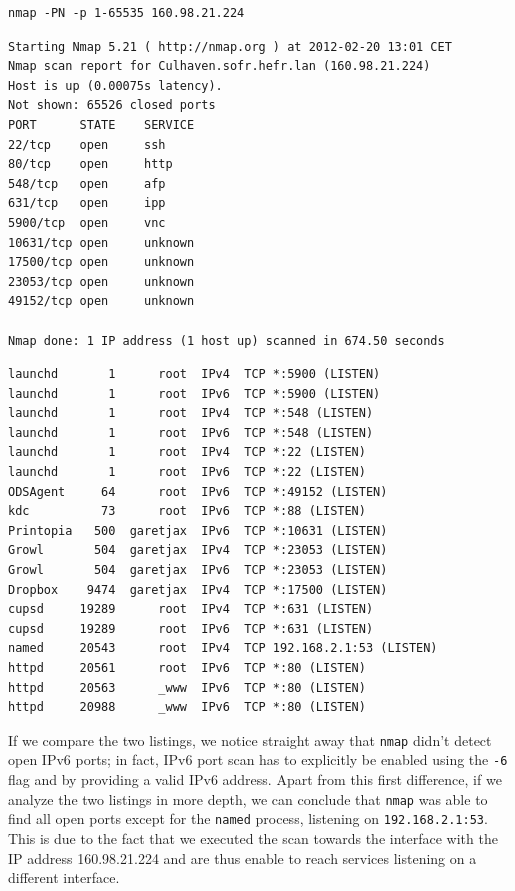\documentclass[10pt,a4paper,twoside,onecolumn]{article}
\begin{document}
\begin{lstlisting}
nmap -PN -p 1-65535 160.98.21.224
\end{lstlisting}

\begin{lstlisting}
Starting Nmap 5.21 ( http://nmap.org ) at 2012-02-20 13:01 CET
Nmap scan report for Culhaven.sofr.hefr.lan (160.98.21.224)
Host is up (0.00075s latency).
Not shown: 65526 closed ports
PORT      STATE    SERVICE
22/tcp    open     ssh
80/tcp    open     http
548/tcp   open     afp
631/tcp   open     ipp
5900/tcp  open     vnc
10631/tcp open     unknown
17500/tcp open     unknown
23053/tcp open     unknown
49152/tcp open     unknown

Nmap done: 1 IP address (1 host up) scanned in 674.50 seconds
\end{lstlisting}

\begin{lstlisting}
launchd       1      root  IPv4  TCP *:5900 (LISTEN)
launchd       1      root  IPv6  TCP *:5900 (LISTEN)
launchd       1      root  IPv4  TCP *:548 (LISTEN)
launchd       1      root  IPv6  TCP *:548 (LISTEN)
launchd       1      root  IPv4  TCP *:22 (LISTEN)
launchd       1      root  IPv6  TCP *:22 (LISTEN)
ODSAgent     64      root  IPv6  TCP *:49152 (LISTEN)
kdc          73      root  IPv6  TCP *:88 (LISTEN)
Printopia   500  garetjax  IPv6  TCP *:10631 (LISTEN)
Growl       504  garetjax  IPv4  TCP *:23053 (LISTEN)
Growl       504  garetjax  IPv6  TCP *:23053 (LISTEN)
Dropbox    9474  garetjax  IPv4  TCP *:17500 (LISTEN)
cupsd     19289      root  IPv4  TCP *:631 (LISTEN)
cupsd     19289      root  IPv6  TCP *:631 (LISTEN)
named     20543      root  IPv4  TCP 192.168.2.1:53 (LISTEN)
httpd     20561      root  IPv6  TCP *:80 (LISTEN)
httpd     20563      _www  IPv6  TCP *:80 (LISTEN)
httpd     20988      _www  IPv6  TCP *:80 (LISTEN)
\end{lstlisting}

If we compare the two listings, we notice straight away that \texttt{nmap} didn't detect open IPv6 ports; in fact, IPv6 port scan has to explicitly be enabled using the \texttt{-6} flag and by providing a valid IPv6 address. Apart from this first difference, if we analyze the two listings in more depth, we can conclude that \texttt{nmap} was able to find all open ports except for the \texttt{named} process, listening on \texttt{192.168.2.1:53}. This is due to the fact that we executed the scan towards the interface with the IP address 160.98.21.224 and are thus enable to reach services listening on a different interface.
\end{document}
